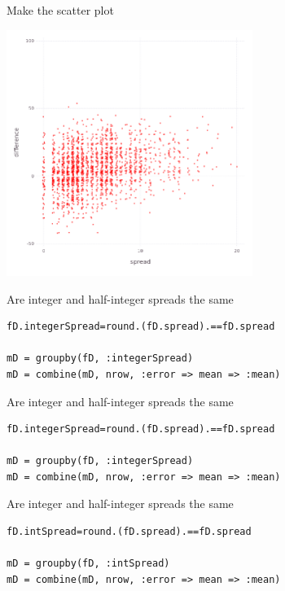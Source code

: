 \documentclass{beamer}
\begin{document}
\begin{frame}{Make the scatter plot}
  \begin{center}
  \includegraphics[width=8cm]{spreadVdiff.png}
\end{center}
  \end{frame}


\begin{frame}[fragile]{Are integer and half-integer spreads the same}
  \begin{lstlisting}
fD.integerSpread=round.(fD.spread).==fD.spread

mD = groupby(fD, :integerSpread)
mD = combine(mD, nrow, :error => mean => :mean)

\end{lstlisting}
\end{frame}


\begin{frame}[fragile]{Are integer and half-integer spreads the same}
  \begin{lstlisting}
fD.integerSpread=round.(fD.spread).==fD.spread

mD = groupby(fD, :integerSpread)
mD = combine(mD, nrow, :error => mean => :mean)

\end{lstlisting}
\end{frame}


\begin{frame}[fragile]{Are integer and half-integer spreads the same}
  \begin{lstlisting}
fD.intSpread=round.(fD.spread).==fD.spread

mD = groupby(fD, :intSpread)
mD = combine(mD, nrow, :error => mean => :mean)

\end{lstlisting}
\end{frame}
\end{document}
